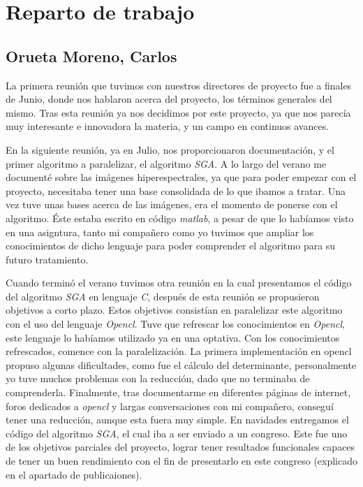 \cleardoublepage
\newpage
\mbox{}

\chapter{Reparto de trabajo}
\label{Appendix:Reparto}

\section{Orueta Moreno, Carlos}

La primera reunión que tuvimos con nuestros directores de proyecto fue a finales de Junio, donde nos hablaron acerca del proyecto, los términos generales del mismo. Tras esta reunión ya nos decidimos por este proyecto, ya que nos parecía muy interesante e innovadora la materia, y un campo en continuos avances.

En la siguiente reunión, ya en Julio, nos proporcionaron documentación, y el primer algoritmo a paralelizar, el algoritmo \textit{SGA}. A lo largo del verano me documenté sobre las imágenes hiperespectrales, ya que para poder empezar con el proyecto, necesitaba tener una base consolidada de lo que ibamos a tratar. Una vez tuve unas bases acerca de las imágenes, era el momento de ponerse con el algoritmo. Éste estaba escrito en código \textit{matlab}, a pesar de que lo habíamos visto en una asigntura, tanto mi compañero como yo tuvimos que ampliar los conocimientos de dicho lenguaje para poder comprender el algoritmo para su futuro tratamiento.

Cuando terminó el verano tuvimos otra reunión en la cual presentamos el código del algoritmo \textit{SGA} en lenguaje \textit{C}, después de esta reunión se propusieron objetivos a corto plazo. Estos objetivos consistían en paralelizar este algoritmo con el uso del lenguaje \textit{Opencl}. Tuve que refrescar los conocimientos en \textit{Opencl}, este lenguaje lo habíamos utilizado ya en una optativa. Con los conocimientos refrescados, comence con la paralelización. La primera implementación en opencl propuso algunas dificultades, como fue el cálculo del determinante, personalmente yo tuve muchos problemas con la reducción, dado que no terminaba de comprenderla. Finalmente, tras documentarme en diferentes páginas de internet, foros dedicados a \textit{opencl} y largas conversaciones con mi compañero, conseguí tener una reducción, aunque esta fuera muy simple. En navidades entregamos el código del algoritmo \textit{SGA}, el cual iba a ser enviado a un congreso. Este fue uno de los objetivos parciales del proyecto, lograr tener resultados funcionales capaces de tener un buen rendimiento con el fin de presentarlo en este congreso (explicado en el apartado de publicaiones).

